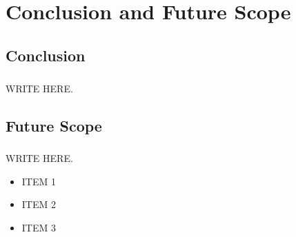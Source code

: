 \chapter{Conclusion and Future Scope}
\section{Conclusion}
\paragraph{}WRITE HERE.
\section{Future Scope}
\paragraph{}WRITE HERE.
\begin{itemize}
 \item ITEM 1
 \item ITEM 2
 \item ITEM 3
\end{itemize}